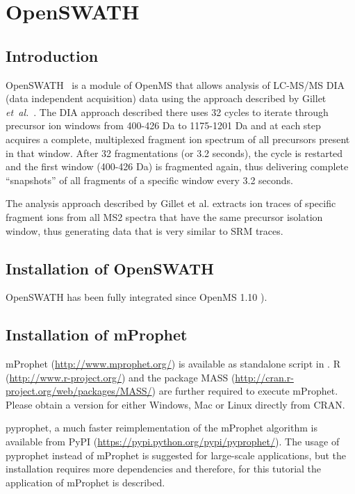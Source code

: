 
\newpage
\section{OpenSWATH}
\subsection{Introduction}

OpenSWATH~\cite{Rost2014fd} is a module of OpenMS that allows analysis of LC-MS/MS DIA (data independent acquisition) data using the approach described by Gillet \textit{et~al.}~\cite{Gillet2012Targeted}. The DIA approach described there uses 32 cycles to iterate through precursor ion windows from 400-426 Da to 1175-1201 Da and at each step acquires a complete, multiplexed fragment ion spectrum of all precursors present in that window. After 32 fragmentations (or 3.2 seconds), the cycle is restarted and the first window (400-426 Da) is fragmented again, thus delivering complete ``snapshots'' of all fragments of a specific window every 3.2 seconds.

The analysis approach described by Gillet et al. extracts ion traces of specific fragment ions from all MS2 spectra that have the same precursor isolation window, thus generating data that is very similar to SRM traces.

\subsection{Installation of OpenSWATH}
OpenSWATH has been fully integrated since OpenMS 1.10 \cite{Kohlbacher2007,Sturm2008,Bertsch2011OpenMS}).

\subsection{Installation of mProphet}
mProphet (\url{http://www.mprophet.org/}) \cite{Reiter2011MProphet} is available as standalone script in . 
R (\url{http://www.r-project.org/}) and the package MASS (\url{http://cran.r-project.org/web/packages/MASS/}) are further required to execute mProphet. 
Please obtain a version for either Windows, Mac or Linux directly from CRAN.

pyprophet, a much faster reimplementation of the mProphet algorithm is available from PyPI (\url{https://pypi.python.org/pypi/pyprophet/}). The usage of pyprophet instead of mProphet is suggested for large-scale applications, but the installation requires more dependencies and therefore, for this tutorial the application of mProphet is described.

